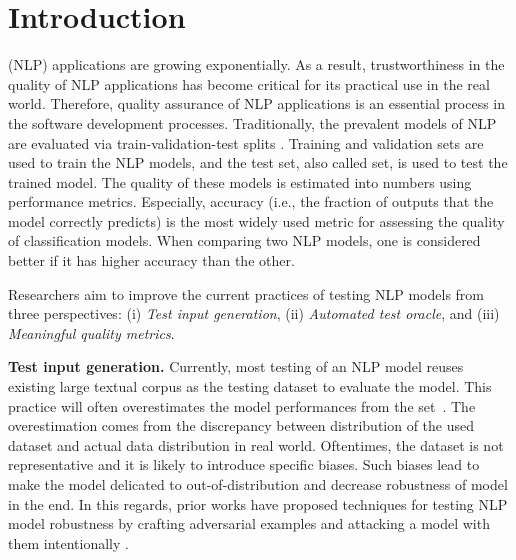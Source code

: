 \section{Introduction}
\label{sec:intro}



\Nlp (NLP) applications are growing exponentially.  As a result,
trustworthiness in the quality of NLP applications has become critical
for its practical use in the real world.  Therefore, quality assurance
of NLP applications is an essential process in the software
development processes.  Traditionally, the prevalent models of NLP are
evaluated via train-validation-test splits \cite{}.  Training and
validation sets are used to train the NLP models, and the test set,
also called \ho set, is used to test the trained model.  The quality
of these models is estimated into numbers using performance
metrics. Especially, accuracy (i.e., the fraction of outputs that the
model correctly predicts) is the most widely used metric for assessing
the quality of classification models. When comparing two NLP models,
one is considered better if it has higher accuracy than the other.

Researchers aim to improve the current practices of testing NLP models
from three perspectives: (i) \emph{Test input generation}, (ii)
\emph{Automated test oracle}, and (iii) \emph{Meaningful quality
  metrics}.

\noindent \textbf{Test input generation.} Currently, most testing of
an NLP model reuses existing large textual corpus as the testing
dataset to evaluate the model. This practice will often overestimates
the model performances from the \ho
set~\cite{patel2018mlevalforsoftware, recht2019imagenetbias,
  marcoACL2020checklist}.  The overestimation comes from the
discrepancy between distribution of the used dataset and actual data
distribution in real world. Oftentimes, the \ho dataset is not
representative and it is likely to introduce specific biases. Such
biases lead to make the model delicated to out-of-distribution and
decrease robustness of model in the end. In this regards, prior works
have proposed techniques for testing NLP model robustness by crafting
adversarial examples and attacking a model with them intentionally
\cite{ribeiro2018sear,belinkov2018breaknmt,
  rychalska2019wildnlp,iyyer2018adversarial}.  

